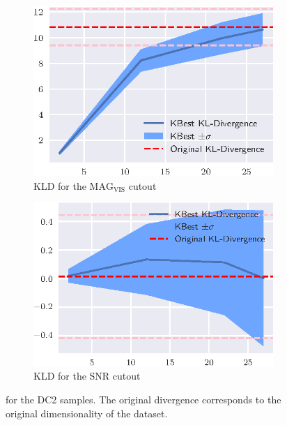 \begin{figure}[htbp]
    \begin{subfigure}[]{0.5\textwidth}
    \includegraphics[width=\textwidth]{images/6_som/divergence/dc2_mag_divergence.eps}
    \caption{\gls{KLD} for the $\text{MAG}_\text{VIS}$ cutout}
    \end{subfigure}
    \hfill
    \begin{subfigure}[]{0.5\textwidth}
    \includegraphics[width=\textwidth]{images/6_som/divergence/dc2_snr_divergence.eps}
    \caption{\gls{KLD} for the \gls{SNR} cutout}
    \end{subfigure}
    \caption{ for the DC2 samples. The original divergence
    corresponds to the original dimensionality of the dataset.}
    \label{fig:divergence_dc2}
\end{figure}

